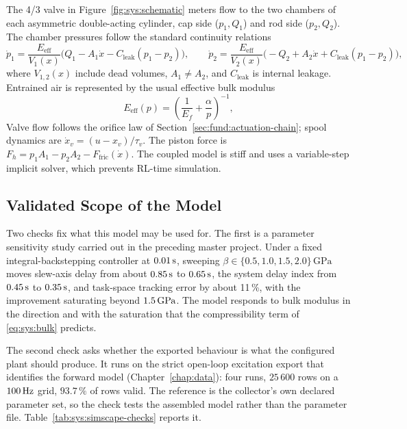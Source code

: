 The 4/3 valve in Figure~\ref{fig:sys:schematic} meters flow to the two chambers
of each asymmetric double-acting cylinder, cap side ($p_1,Q_1$) and rod side
($p_2,Q_2$). The chamber pressures follow the standard continuity
relations~\cite{merritt1967hydraulic,jelali2003hydraulic}
%
\begin{equation}
  \label{eq:sys:continuity}
  \dot{p}_1 = \frac{E_{\mathrm{eff}}}{V_1(x)}
    \bigl( Q_1 - A_1 \dot{x} - C_{\mathrm{leak}}(p_1 - p_2) \bigr),
  \qquad
  \dot{p}_2 = \frac{E_{\mathrm{eff}}}{V_2(x)}
    \bigl( -Q_2 + A_2 \dot{x} + C_{\mathrm{leak}}(p_1 - p_2) \bigr),
\end{equation}
%
where $V_{1,2}(x)$ include dead volumes, $A_1\neq A_2$, and
$C_{\mathrm{leak}}$ is internal leakage. Entrained air is represented by the
usual effective bulk modulus~\cite{jelali2003hydraulic}
%
\begin{equation}
  \label{eq:sys:bulk}
  E_{\mathrm{eff}}(p) =
  \left( \frac{1}{E_f} + \frac{\alpha}{p} \right)^{-1},
\end{equation}
%
Valve flow follows the orifice law of
Section~\ref{sec:fund:actuation-chain}; spool dynamics are
$\dot{x}_v=(u-x_v)/\tau_v$. The piston force is
$F_h=p_1A_1-p_2A_2-F_{\mathrm{fric}}(\dot{x})$. The coupled model is stiff and
uses a variable-step implicit solver, which prevents RL-time simulation.

\subsection{Validated Scope of the Model}
\label{sec:sys:simscape-validation}

Two checks fix what this model may be used for. The first is a parameter
sensitivity study carried out in the preceding master project. Under a fixed
integral-backstepping controller at $\unit[0.01]{s}$, sweeping
$\beta\in\{0.5,1.0,1.5,2.0\}\,\mathrm{GPa}$ moves slew-axis delay from about
$\unit[0.85]{s}$ to $\unit[0.65]{s}$, the system delay index from
$\unit[0.45]{s}$ to $\unit[0.35]{s}$, and task-space tracking error by about
11\,\%, with the improvement saturating beyond $\unit[1.5]{GPa}$. The model
responds to bulk modulus in the direction and with the saturation that the
compressibility term of \eqref{eq:sys:bulk} predicts.

The second check asks whether the exported behaviour is what the configured
plant should produce. It runs on the strict open-loop excitation export that
identifies the forward model (Chapter~\ref{chap:data}): four runs, $25\,600$
rows on a $\unit[100]{Hz}$ grid, $93.7\,\%$ of rows valid. The reference is the
collector's own declared parameter set, so the check tests the assembled model
rather than the parameter file. Table~\ref{tab:sys:simscape-checks} reports it.

